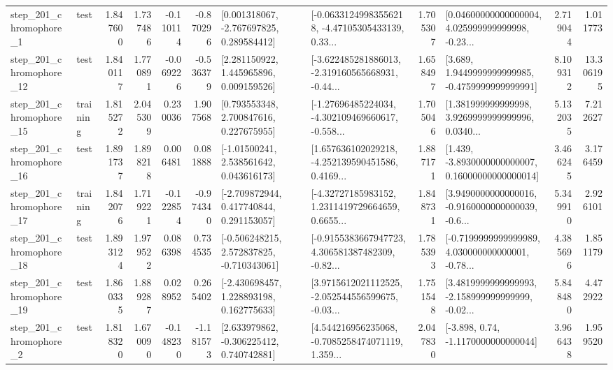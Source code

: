 \begin{tabular}{llrrrrllrlrr}
   step\_201\_chromophore\_1 &      test &      1.847600 &    1.737486 &     -0.110114 & -0.870296 &    [0.001318067, -2.767697825, 0.289584412] &  [-0.06331249983556218, -4.47105305433139, 0.33... &       1.705307 &  [0.04600000000000004, 4.025999999999998, -0.23... &            2.719044 &          1.011773 \\
  step\_201\_chromophore\_12 &      test &      1.840117 &    1.770891 &     -0.069226 & -0.536379 &     [2.281150922, 1.445965896, 0.009159526] &  [-3.622485281886013, -2.319160565668931, -0.44... &       1.658497 &   [3.689, 1.9449999999999985, -0.4759999999999991] &            8.109312 &         13.306195 \\
  step\_201\_chromophore\_15 &  training &      1.815272 &    2.045309 &      0.230036 &  1.907568 &     [0.793553348, 2.700847616, 0.227675955] &  [-1.27696485224034, -4.302109469660617, -0.558... &       1.705046 &  [1.381999999999998, 3.9269999999999996, 0.0340... &            5.132035 &          7.212627 \\
  step\_201\_chromophore\_16 &      test &      1.891737 &    1.898218 &      0.006481 &  0.081888 &     [-1.01500241, 2.538561642, 0.043616173] &  [1.657636102029218, -4.252139590451586, 0.4169... &       1.887171 &  [1.439, -3.8930000000000007, 0.16000000000000014] &            3.466245 &          3.176459 \\
  step\_201\_chromophore\_17 &  training &      1.842076 &    1.719221 &     -0.122854 & -0.974340 &    [-2.709872944, 0.417740844, 0.291153057] &  [-4.32727185983152, 1.2311419729664659, 0.6655... &       1.848731 &  [3.9490000000000016, -0.9160000000000039, -0.6... &            5.349910 &          2.926101 \\
  step\_201\_chromophore\_18 &      test &      1.893124 &    1.979522 &      0.086398 &  0.734535 &   [-0.506248215, 2.572837825, -0.710343061] &  [-0.9155383667947723, 4.306581387482309, -0.82... &       1.785393 &  [-0.7199999999999989, 4.030000000000001, -0.78... &            4.385696 &          1.851179 \\
  step\_201\_chromophore\_19 &      test &      1.860335 &    1.889287 &      0.028952 &  0.265402 &    [-2.430698457, 1.228893198, 0.162775633] &  [3.9715612021112525, -2.052544556599675, -0.03... &       1.751548 &  [3.4819999999999993, -2.158999999999999, -0.02... &            5.848480 &          4.472922 \\
   step\_201\_chromophore\_2 &      test &      1.818320 &    1.670090 &     -0.148230 & -1.181573 &    [2.633979862, -0.306225412, 0.740742881] &  [4.544216956235068, -0.7085258474071119, 1.359... &       2.047830 &                [-3.898, 0.74, -1.1170000000000044] &            3.966438 &          1.959520 \\

\end{tabular}
